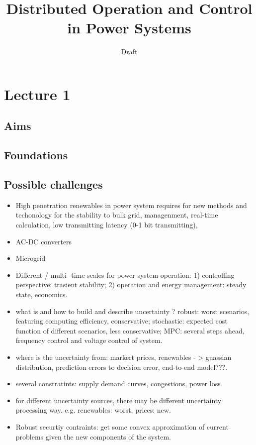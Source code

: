 \documentclass{article}
\title{Distributed Operation and Control in Power Systems}
\author{
  Draft \\
}
\begin{document}
\maketitle

\begin{abstract}


\end{abstract}

\section{Lecture 1}
\subsection{Aims}

\subsection{Foundations}

\subsection{Possible challenges}
\begin{itemize}
  \item High penetration renewables in power system requires for new methods and techonology for the stability to bulk grid, managenment, real-time calculation, low transmitting latency (0-1 bit transmitting),  
  \item AC-DC converters
  \item Microgrid
  \item Different / multi- time scales for power system operation: 1) controlling perspective: trasient stability; 2) operation and energy management: steady state, economics.
  \item what is and how to build and describe uncertainty ? robust: worst scenarios, featuring computing efficiency, conservative; stochastic: expected cost function of different scenarios, less conservative; MPC: several steps ahead, frequency control and voltage control of system. 
  \item where is the uncertainty from: markert prices, renewables - > guassian distribution, prediction errors to decision error, end-to-end model???.
  \item several constratints: supply demand curves, congestions, power loss.
  \item for different uncertainty sources, there may be different uncertainty processing way. e.g. renewables: worst, prices: new.
  \item Robust securtiy contraints: get some convex approximation of current problems given the new components of the system. 
\end{itemize}
\end{document}
